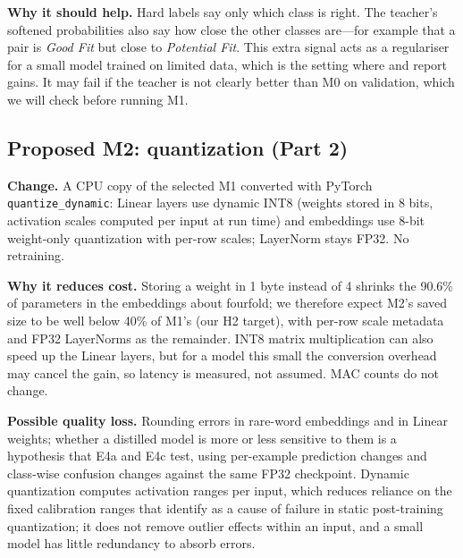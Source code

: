 \documentclass[11pt]{article}
\begin{document}
\textbf{Why it should help.} Hard labels say only which class is right. The teacher's softened probabilities also say how close the other classes are---for example that a pair is \emph{Good Fit} but close to \emph{Potential Fit}. This extra signal acts as a regulariser for a small model trained on limited data, which is the setting where \citet{hinton} and \citet{turc} report gains. It may fail if the teacher is not clearly better than M0 on validation, which we will check before running M1.

\subsection{Proposed M2: quantization (Part 2)}
\textbf{Change.} A CPU copy of the selected M1 converted with PyTorch \texttt{quantize\_dynamic}: Linear layers use dynamic INT8 (weights stored in 8 bits, activation scales computed per input at run time) and embeddings use 8-bit weight-only quantization with per-row scales; LayerNorm stays FP32. No retraining.

\textbf{Why it reduces cost.} Storing a weight in 1 byte instead of 4 shrinks the 90.6\% of parameters in the embeddings about fourfold; we therefore expect M2's saved size to be well below 40\% of M1's (our H2 target), with per-row scale metadata and FP32 LayerNorms as the remainder. INT8 matrix multiplication can also speed up the Linear layers, but for a model this small the conversion overhead may cancel the gain, so latency is measured, not assumed. MAC counts do not change.

\textbf{Possible quality loss.} Rounding errors in rare-word embeddings and in Linear weights; whether a distilled model is more or less sensitive to them is a hypothesis that E4a and E4c test, using per-example prediction changes and class-wise confusion changes against the same FP32 checkpoint. Dynamic quantization computes activation ranges per input, which reduces reliance on the fixed calibration ranges that \citet{bondarenko} identify as a cause of failure in static post-training quantization; it does not remove outlier effects within an input, and a small model has little redundancy to absorb errors.
\end{document}
